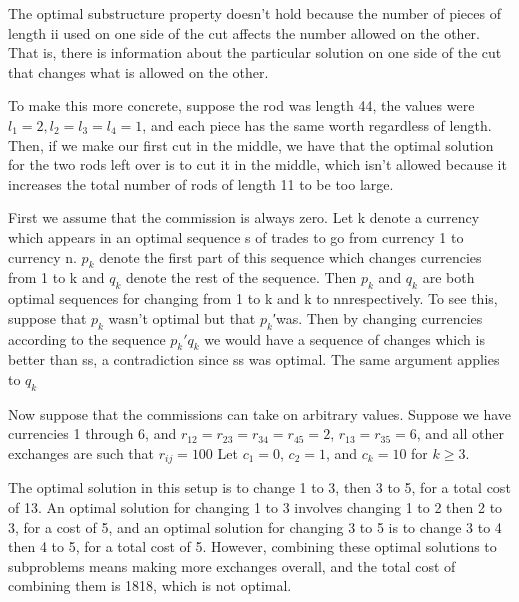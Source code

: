 \documentclass[a4paper, justified]{tufte-handout}
\begin{document}
\begin{solution}
  The optimal substructure property doesn't hold because the number of pieces of length ii used on one side of the cut affects the number allowed on the other. That is, there is information about the particular solution on one side of the cut that changes what is allowed on the other.

  To make this more concrete, suppose the rod was length 44, the values were $l_1 = 2, l_2 = l_3 = l_4 = 1$, and each piece has the same worth regardless of length. Then, if we make our first cut in the middle, we have that the optimal solution for the two rods left over is to cut it in the middle, which isn't allowed because it increases the total number of rods of length 11 to be too large.
\end{solution}

\begin{problem}[TC 15.3-6]
\end{problem}

\begin{solution}
  First we assume that the commission is always zero. Let k denote a currency which appears in an optimal sequence s of trades to go from currency 1 to currency n. $p_k$ denote the first part of this sequence which changes currencies from 1 to k and $q_k$ denote the rest of the sequence. Then $p_k$
  and $q_k$ are both optimal sequences for changing from 1 to k and k to nnrespectively. To see this, suppose that $p_k$ wasn't optimal but that $p_k$′was. Then by changing currencies according to the sequence $p_k'q_k$
  we would have a sequence of changes which is better than ss, a contradiction since ss was optimal. The same argument applies to $q_k$

  Now suppose that the commissions can take on arbitrary values. Suppose we have currencies 1 through 6, and $r_{12} = r_{23} = r_{34} = r_{45} = 2$, $r_{13} = r_{35} = 6$, and all other exchanges are such that $r_{ij} = 100$ Let $c_1 = 0$, $c_2 = 1$, and $c_k = 10$ for $k \ge 3$.

  The optimal solution in this setup is to change 1 to 3, then 3 to 5, for a total cost of 13. An optimal solution for changing 1 to 3 involves changing 1 to 2 then 2 to 3, for a cost of 5, and an optimal solution for changing 3 to 5 is to change 3 to 4 then 4 to 5, for a total cost of 5. However, combining these optimal solutions to subproblems means making more exchanges overall, and the total cost of combining them is 1818, which is not optimal.
\end{solution}
\end{document}
